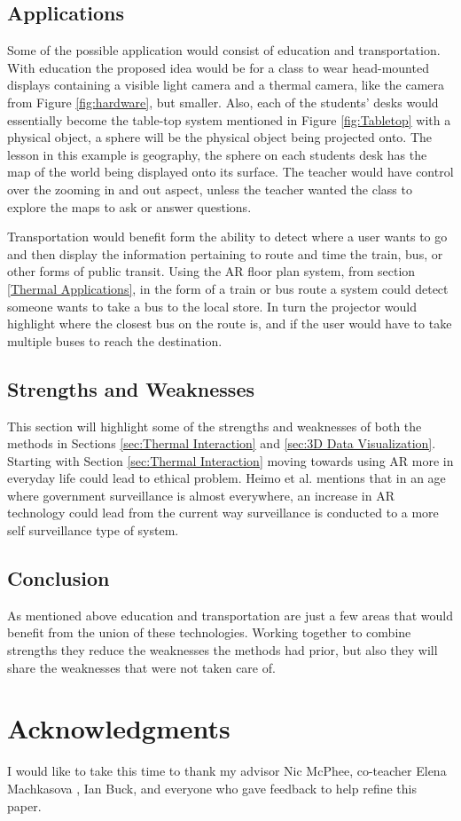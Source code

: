 \documentclass{sig-alternate}
\begin{document}
\subsection{Applications}
\label{Applications}
Some of the possible application would consist of education and transportation. With education the proposed idea would be for a class to wear head-mounted displays containing a visible light camera and a thermal camera, like the camera from Figure \ref{fig:hardware}, but smaller. Also, each of the students' desks would essentially become the table-top system mentioned in Figure \ref{fig:Tabletop} with a physical object, a sphere will be the physical object being projected onto. The lesson in this example is geography, the sphere on each students desk has the map of the world being displayed onto its surface. The teacher would have control over the zooming in and out aspect, unless the teacher wanted the class to explore the maps to ask or answer questions.

Transportation would benefit form the ability to detect where a user wants to go and then display the information pertaining to route and time the train, bus, or other forms of public transit. Using the AR floor plan system, from section \ref{Thermal Applications}, in the form of a train or bus route a system could detect someone wants to take a bus to the local store. In turn the projector would highlight where the closest bus on the route is, and if the user would have to take multiple buses to reach the destination. 


\subsection{Strengths and Weaknesses}
\label{Strengths and Weaknesses}
This section will highlight some of the strengths and weaknesses of both the methods in Sections \ref{sec:Thermal Interaction} and \ref{sec:3D Data Visualization}. Starting with Section \ref{sec:Thermal Interaction} moving towards using AR more in everyday life could lead to ethical problem. Heimo et al. \cite{ethics} mentions that in an age where government surveillance is almost everywhere, an increase in AR technology could lead from the current way surveillance is conducted to a more self surveillance type of system.        


\subsection{Conclusion}
\label{Conclusion} 
As mentioned above education and transportation are just a few areas that would benefit from the union of these technologies. Working together to combine strengths they reduce the weaknesses the methods had prior, but also they will share the weaknesses that were not taken care of.  


\section{Acknowledgments}
\label{sec:Acknowledgments}
I would like to take this time to thank my advisor Nic McPhee, co-teacher Elena Machkasova    , Ian Buck, and everyone who gave feedback to help refine this paper. 


\end{document}
